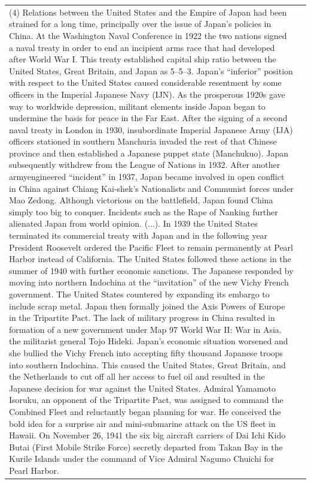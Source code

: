 {\begin{longtable}{p{}p{}}
(4) Relations between the United States and the Empire of Japan had been strained for a long time, principally over the issue of Japan's policies in China. At the Washington Naval Conference in 1922 the two nations signed a naval treaty in order to end an incipient arms race that had developed after World War I. This treaty established capital ship ratio between the United States, Great Britain, and Japan as 5–5–3. Japan's “inferior” position with respect to the United States caused considerable resentment by some officers in the Imperial Japanese Navy (IJN). As the prosperous 1920s gave way to worldwide depression, militant elements inside Japan began to undermine the basis for peace in the Far East. After the signing of a second naval treaty in London in 1930, insubordinate Imperial Japanese Army (IJA) officers stationed in southern Manchuria invaded the rest of that Chinese province and then established a Japanese puppet state (Manchukuo). Japan subsequently withdrew from the League of Nations in 1932. After another armyengineered “incident” in 1937, Japan became involved in open conflict in China against Chiang Kai-shek's Nationalists and Communist forces under Mao Zedong. Although victorious on the battlefield, Japan found China simply too big to conquer. Incidents such as the Rape of Nanking further alienated Japan from world opinion. (...). 
In 1939 the United States terminated its commercial treaty with Japan and in the following year President Roosevelt ordered the Pacific Fleet to remain permanently at Pearl Harbor instead of California. The United States followed these actions in the summer of 1940 with further economic sanctions. The Japanese responded by moving into northern Indochina at the “invitation” of the new Vichy French government. The United States countered by expanding its embargo to include scrap metal. Japan then formally joined the Axis Powers of Europe in the Tripartite Pact. The lack of military progress in China resulted in formation of a new government under Map 97 World War II: War in Asia. the militarist general Tojo Hideki. Japan's economic situation worsened and she bullied the Vichy French into accepting fifty thousand Japanese troops into southern Indochina. This caused the United States, Great Britain, and the Netherlands to cut off all her access to fuel oil and resulted in the Japanese decision for war against the United States. Admiral Yamamoto Isoruku, an opponent of the Tripartite Pact, was assigned to command the Combined Fleet and reluctantly began planning for war. He conceived the bold idea for a surprise air and mini-submarine attack on the US fleet in Hawaii. On November 26, 1941 the six big aircraft carriers of Dai Ichi Kido Butai (First Mobile Strike Force) secretly departed from Takan Bay in the Kurile Islands under the command of Vice Admiral Nagumo Chuichi for Pearl Harbor.

\end{longtable}}
